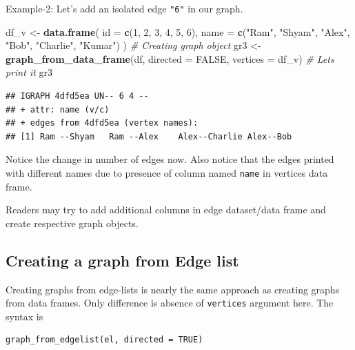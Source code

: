 \documentclass[
]{book}
\newenvironment{Shaded}{\begin{snugshade}}{\end{snugshade}}
\newcommand{\AttributeTok}[1]{\textcolor[rgb]{0.13,0.29,0.53}{#1}}
\newcommand{\CommentTok}[1]{\textcolor[rgb]{0.56,0.35,0.01}{\textit{#1}}}
\newcommand{\ConstantTok}[1]{\textcolor[rgb]{0.56,0.35,0.01}{#1}}
\newcommand{\DecValTok}[1]{\textcolor[rgb]{0.00,0.00,0.81}{#1}}
\newcommand{\FunctionTok}[1]{\textcolor[rgb]{0.13,0.29,0.53}{\textbf{#1}}}
\newcommand{\NormalTok}[1]{#1}
\newcommand{\OtherTok}[1]{\textcolor[rgb]{0.56,0.35,0.01}{#1}}
\newcommand{\StringTok}[1]{\textcolor[rgb]{0.31,0.60,0.02}{#1}}
\begin{document}
Example-2: Let's add an isolated edge \texttt{"6"} in our graph.

\begin{Shaded}
\begin{Highlighting}[]
\NormalTok{df\_v }\OtherTok{\textless{}{-}} \FunctionTok{data.frame}\NormalTok{(}
  \AttributeTok{id =} \FunctionTok{c}\NormalTok{(}\DecValTok{1}\NormalTok{, }\DecValTok{2}\NormalTok{, }\DecValTok{3}\NormalTok{, }\DecValTok{4}\NormalTok{, }\DecValTok{5}\NormalTok{, }\DecValTok{6}\NormalTok{),}
  \AttributeTok{name =} \FunctionTok{c}\NormalTok{(}\StringTok{"Ram"}\NormalTok{, }\StringTok{"Shyam"}\NormalTok{, }\StringTok{"Alex"}\NormalTok{, }\StringTok{"Bob"}\NormalTok{, }\StringTok{"Charlie"}\NormalTok{, }\StringTok{"Kumar"}\NormalTok{)}
\NormalTok{)}
\CommentTok{\# Creating graph object}
\NormalTok{gr3 }\OtherTok{\textless{}{-}} \FunctionTok{graph\_from\_data\_frame}\NormalTok{(df, }\AttributeTok{directed =} \ConstantTok{FALSE}\NormalTok{, }\AttributeTok{vertices =}\NormalTok{ df\_v)}
\CommentTok{\# Let\textquotesingle{}s print it}
\NormalTok{gr3}
\end{Highlighting}
\end{Shaded}

\begin{verbatim}
## IGRAPH 4dfd5ea UN-- 6 4 -- 
## + attr: name (v/c)
## + edges from 4dfd5ea (vertex names):
## [1] Ram --Shyam   Ram --Alex    Alex--Charlie Alex--Bob
\end{verbatim}

Notice the change in number of edges now. Also notice that the edges printed with different names due to presence of column named \texttt{name} in vertices data frame.

Readers may try to add additional columns in edge dataset/data frame and create respective graph objects.

\hypertarget{creating-a-graph-from-edge-list}{%
\subsection{Creating a graph from Edge list}\label{creating-a-graph-from-edge-list}}

Creating graphs from edge-lists is nearly the same approach as creating graphs from data frames. Only difference is absence of \texttt{vertices} argument here. The syntax is

\begin{verbatim}
graph_from_edgelist(el, directed = TRUE)
\end{verbatim}
\end{document}
